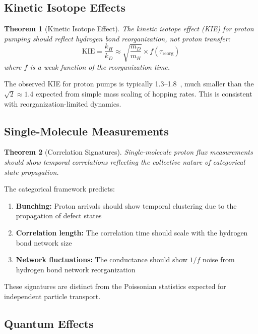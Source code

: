 \documentclass[twocolumn,showpacs,preprintnumbers,amsmath,amssymb,prd]{revtex4-2}
\newtheorem{theorem}{Theorem}[section]
\begin{document}
\subsection{Kinetic Isotope Effects}

\begin{theorem}[Kinetic Isotope Effect]
\label{thm:kie}
The kinetic isotope effect (KIE) for proton pumping should reflect hydrogen bond reorganization, not proton transfer:
\begin{equation}
\text{KIE} = \frac{k_H}{k_D} \approx \sqrt{\frac{m_D}{m_H}} \times f(\tau_{\text{reorg}})
\label{eq:kie}
\end{equation}
where $f$ is a weak function of the reorganization time.
\end{theorem}

The observed KIE for proton pumps is typically 1.3--1.8~\cite{Wikstrom2015}, much smaller than the $\sqrt{2} \approx 1.4$ expected from simple mass scaling of hopping rates. This is consistent with reorganization-limited dynamics.

\subsection{Single-Molecule Measurements}

\begin{theorem}[Correlation Signatures]
\label{thm:correlations}
Single-molecule proton flux measurements should show temporal correlations reflecting the collective nature of categorical state propagation.
\end{theorem}

The categorical framework predicts:
\begin{enumerate}
\item \textbf{Bunching:} Proton arrivals should show temporal clustering due to the propagation of defect states
\item \textbf{Correlation length:} The correlation time should scale with the hydrogen bond network size
\item \textbf{Network fluctuations:} The conductance should show $1/f$ noise from hydrogen bond network reorganization
\end{enumerate}

These signatures are distinct from the Poissonian statistics expected for independent particle transport.

\subsection{Quantum Effects}
\end{document}
